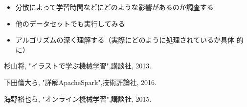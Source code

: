 \documentclass[a4paper,12pt]{jarticle}
\begin{document}
\begin{itemize}
 \item 分散によって学習時間などにどのような影響があるのか調査する
 \item 他のデータセットでも実行してみる
 \item アルゴリズムの深く理解する（実際にどのように処理されているか具体
	   的に） 
\end{itemize}


\begin{thebibliography}{99}

  杉山将,
		 "イラストで学ぶ機械学習",講談社, 2013.

 下田倫大ら,
		"詳解ApacheSpark",技術評論社, 2016.

  海野裕也ら,
		 "オンライン機械学習",講談社, 2015.

\end{thebibliography}
\end{document}

